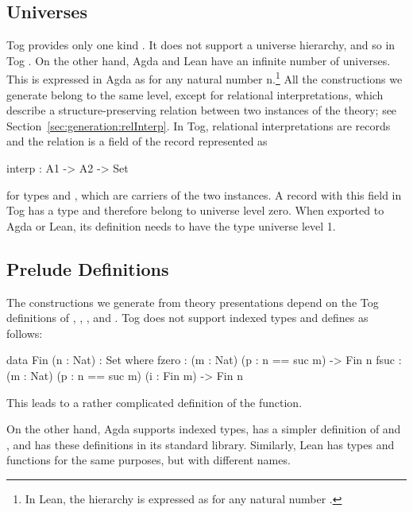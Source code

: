 \subsection{Universes}
Tog provides only one kind . It does not support a universe hierarchy, and so in Tog . On the other hand, Agda and Lean have an infinite number of universes. This is expressed in Agda as 
 for any natural number $\text{n}$.\footnote{In Lean, the hierarchy is expressed as  for any natural number .}
All the constructions we generate belong to the same level, except for relational interpretations, which describe a structure-preserving relation between two instances of the theory; see Section~\ref{sec:generation:relInterp}. In Tog, relational interpretations are records and the relation is a field of the record represented as 
\begin{togcode}
interp : A1 -> A2 -> Set
\end{togcode}
\noindent for types  and , which are carriers of the two instances. 
A record with this field in Tog has a type  and therefore belong to universe level zero. When exported to Agda or Lean, its definition needs to have the type universe level 1.  

\subsection{Prelude Definitions}
The constructions we generate from theory presentations depend on the Tog definitions of , , , and . Tog does not support indexed types and defines  as follows:
\begin{togcode}
data Fin (n : Nat) : Set where
  fzero : (m : Nat) (p : n == suc m) -> Fin n
  fsuc  : (m : Nat) (p : n == suc m) (i : Fin m) -> Fin n
\end{togcode}
\noindent This leads to a rather complicated definition of the  function. 

On the other hand, Agda supports indexed types, has a simpler definition of  and , and has these definitions in its standard library. Similarly, Lean has types and functions for the same purposes, but with different names.

